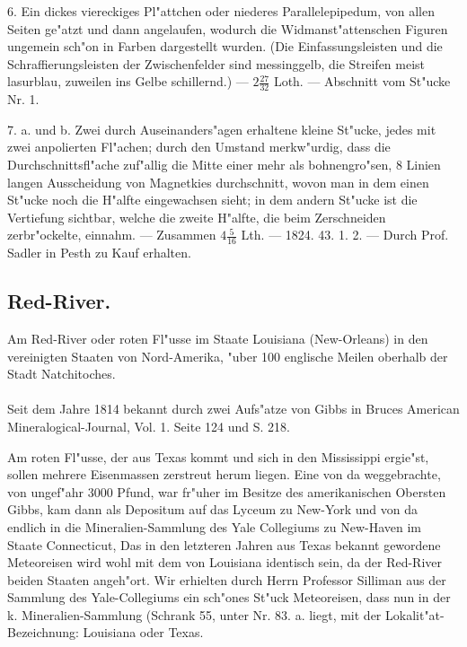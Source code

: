\documentclass[a4paper, 11pt, oneside, polutonikogreek, german]{article}
\begin{document}
6. Ein dickes viereckiges Pl"attchen oder niederes Parallelepipedum, von allen Seiten ge"atzt und dann angelaufen, wodurch die Widmanst"attenschen Figuren ungemein sch"on in Farben dargestellt wurden. (Die Einfassungsleisten und die Schraffierungsleisten der Zwischenfelder sind messinggelb, die Streifen meist lasurblau, zuweilen ins Gelbe schillernd.) --- $2\frac{27}{32}$ Loth. --- Abschnitt vom St"ucke Nr. 1.

7. a. und b. Zwei durch Auseinanders"agen erhaltene kleine St"ucke, jedes mit zwei anpolierten Fl"achen; durch den Umstand merkw"urdig, dass die Durchschnittsfl"ache zuf"allig die Mitte einer mehr als bohnengro"sen, 8 Linien langen Ausscheidung von Magnetkies durchschnitt, wovon man in dem einen St"ucke noch die H"alfte eingewachsen sieht; in dem andern St"ucke ist die Vertiefung sichtbar, welche die zweite H"alfte, die beim Zerschneiden zerbr"ockelte, einnahm. --- Zusammen $4\frac{5}{16}$ Lth. --- 1824. 43. 1. 2. --- Durch Prof. Sadler in Pesth zu Kauf erhalten.
\subsection{Red-River.}
\begin{center}
\small
Am Red-River oder roten Fl"usse im Staate Louisiana (New-Orleans) in den vereinigten Staaten von Nord-Amerika, "uber 100 englische Meilen oberhalb der Stadt Natchitoches.
\end{center}
\paragraph{}
Seit dem Jahre 1814 bekannt durch zwei Aufs"atze von Gibbs in Bruces American Mineralogical-Journal, Vol. 1. Seite 124 und S. 218.

Am roten Fl"usse, der aus Texas kommt und sich in den Mississippi ergie"st, sollen mehrere Eisenmassen zerstreut herum liegen. Eine von da weggebrachte, von ungef"ahr 3000 Pfund, war fr"uher im Besitze des amerikanischen Obersten Gibbs, kam dann als Depositum auf das Lyceum zu New-York und von da endlich in die Mineralien-Sammlung des Yale Collegiums zu New-Haven im Staate Connecticut, Das in den letzteren Jahren aus Texas bekannt gewordene Meteoreisen wird wohl mit dem von Louisiana identisch sein, da der Red-River beiden Staaten angeh"ort. Wir erhielten durch Herrn Professor Silliman aus der Sammlung des Yale-Collegiums ein sch"ones St"uck Meteoreisen, dass nun in der k. Mineralien-Sammlung (Schrank 55, unter Nr. 83. a. liegt, mit der Lokalit"at-Bezeichnung: Louisiana oder Texas.
\end{document}
